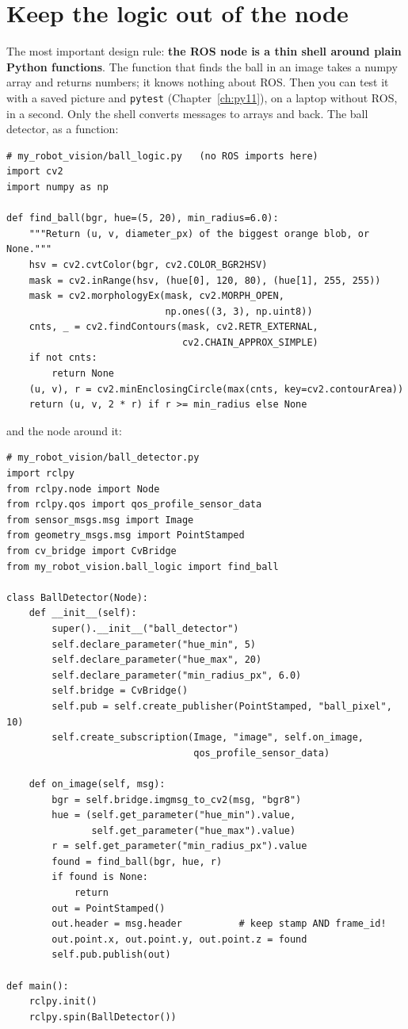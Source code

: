 \section*{Keep the logic out of the node}
The most important design rule: \textbf{the ROS node is a thin shell around plain Python functions}. The function that finds the ball in an image takes a numpy array and returns numbers; it knows nothing about ROS. Then you can test it with a saved picture and \verb!pytest! (Chapter~\ref{ch:py11}), on a laptop without ROS, in a second. Only the shell converts messages to arrays and back. The ball detector, as a function:
\begin{verbatim}
# my_robot_vision/ball_logic.py   (no ROS imports here)
import cv2
import numpy as np

def find_ball(bgr, hue=(5, 20), min_radius=6.0):
    """Return (u, v, diameter_px) of the biggest orange blob, or None."""
    hsv = cv2.cvtColor(bgr, cv2.COLOR_BGR2HSV)
    mask = cv2.inRange(hsv, (hue[0], 120, 80), (hue[1], 255, 255))
    mask = cv2.morphologyEx(mask, cv2.MORPH_OPEN,
                            np.ones((3, 3), np.uint8))
    cnts, _ = cv2.findContours(mask, cv2.RETR_EXTERNAL,
                               cv2.CHAIN_APPROX_SIMPLE)
    if not cnts:
        return None
    (u, v), r = cv2.minEnclosingCircle(max(cnts, key=cv2.contourArea))
    return (u, v, 2 * r) if r >= min_radius else None
\end{verbatim}
and the node around it:
\begin{verbatim}
# my_robot_vision/ball_detector.py
import rclpy
from rclpy.node import Node
from rclpy.qos import qos_profile_sensor_data
from sensor_msgs.msg import Image
from geometry_msgs.msg import PointStamped
from cv_bridge import CvBridge
from my_robot_vision.ball_logic import find_ball

class BallDetector(Node):
    def __init__(self):
        super().__init__("ball_detector")
        self.declare_parameter("hue_min", 5)
        self.declare_parameter("hue_max", 20)
        self.declare_parameter("min_radius_px", 6.0)
        self.bridge = CvBridge()
        self.pub = self.create_publisher(PointStamped, "ball_pixel", 10)
        self.create_subscription(Image, "image", self.on_image,
                                 qos_profile_sensor_data)

    def on_image(self, msg):
        bgr = self.bridge.imgmsg_to_cv2(msg, "bgr8")
        hue = (self.get_parameter("hue_min").value,
               self.get_parameter("hue_max").value)
        r = self.get_parameter("min_radius_px").value
        found = find_ball(bgr, hue, r)
        if found is None:
            return
        out = PointStamped()
        out.header = msg.header          # keep stamp AND frame_id!
        out.point.x, out.point.y, out.point.z = found
        self.pub.publish(out)

def main():
    rclpy.init()
    rclpy.spin(BallDetector())
\end{verbatim}
